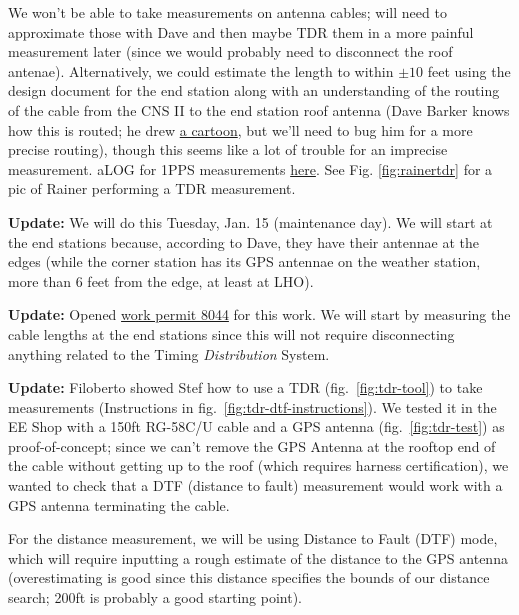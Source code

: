 \documentclass{article}
\begin{document}
We won't be able to take measurements on antenna cables; will need to approximate those with Dave and then maybe TDR them in a more painful measurement later (since we would probably need to disconnect the roof antenae). Alternatively, we could estimate the length to within $\pm10$ feet using the design document for the end station along with an understanding of the routing of the cable from the CNS II to the end station roof antenna (Dave Barker knows how this is routed; he drew 
\hyperref[fig:routing]{a cartoon}, but we'll need to bug him for a more precise routing), though this seems like a lot of trouble for an imprecise measurement. aLOG for 1PPS measurements 
\href{https://alog.ligo-wa.caltech.edu/aLOG/index.php?callRep=43185}{here}. See Fig. \ref{fig:rainertdr} for a pic of Rainer performing a TDR measurement.

\textbf{Update:} We will do this Tuesday, Jan. 15 (maintenance day). We will start at the end stations because, according to Dave, they have their antennae at the edges (while the corner station has its GPS antennae on the weather station, more than 6 feet from the edge, at least at LHO).

\textbf{Update:} Opened \href{https://services.ligo-la.caltech.edu/LHO/workpermits/view.php?permit_id=8044}{work permit 8044} for this work. We will start by measuring the cable lengths at the end stations since this will not require disconnecting anything related to the Timing \textit{Distribution} System.

\textbf{Update:} Filoberto showed Stef how to use a TDR (fig.~\ref{fig:tdr-tool}) to take measurements (Instructions in fig.~\ref{fig:tdr-dtf-instructions}). We tested it in the EE Shop with a 150ft RG-58C/U cable and a GPS antenna (fig.~\ref{fig:tdr-test}) as proof-of-concept; since we can't remove the GPS Antenna at the rooftop end of the cable without getting up to the roof (which requires harness certification), we wanted to check that a DTF (distance to fault) measurement would work with a GPS antenna terminating the cable.

For the distance measurement, we will be using Distance to Fault (DTF) mode, which will require inputting a rough estimate of the distance to the GPS antenna (overestimating is good since this distance specifies the bounds of our distance search; 200ft is probably a good starting point). 
\end{document}
